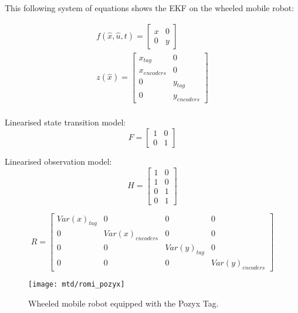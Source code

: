This following system of equations shows the EKF on the wheeled mobile robot:

\begin{equation*}
    \begin{split}
        f(\hat{x},\hat{u},t) = \left[ \begin{array}{cc}
                              x & 0\\
                              0 & y
        \end{array} \right]\\
        z(\hat{x}) = \left[ \begin{array}{cc}
                              x_{tag} & 0\\
                              x_{encoders} & 0\\
                                0 & y_{tag}\\
                                0 & y_{encoders}
        \end{array} \right]\\
    \end{split}
\end{equation*}


Linearised state transition model:
\[
    F =
    \left[ \begin{array}{cc}
    1 & 0\\
    0 & 1
    \end{array}
    \right]
\]

Linearised observation model:
\[
    H =
    \left[ \begin{array}{cc}
    1 & 0\\
    1 & 0\\
    0 & 1\\
    0 & 1
    \end{array}
    \right]
\]

\[
    R =
%
        \left[
            \begin{array}{cccc}
                Var(x)_{tag} & 0 & 0 & 0\\
                0 & Var(x)_{encoders} & 0 & 0\\
                0 & 0 & Var(y)_{tag}& 0 \\
                0 & 0 & 0 & Var(y)_{encoders}
            \end{array}
        \right]
\]

\begin{figure}[ht!]
    \centering
    \texttt{[image: mtd/romi\_pozyx]}
    \caption{Wheeled mobile robot equipped with the Pozyx Tag.}
    \label{fig:poz_romi}
\end{figure}

